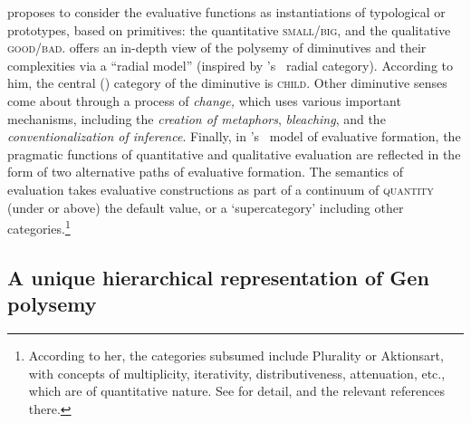 \citet{Wierzbicka1989} proposes to consider the evaluative functions as
instantiations of typological or  prototypes, based on 
primitives: the quantitative \textsc{small/big}, and the qualitative
\textsc{good/bad}. \citet{Jurafsky1996} offers an in-depth view of the polysemy
of diminutives and their  complexities via a ``radial model'' (inspired
by \citeauthor{Lakoff1987}'s~\citeyear{Lakoff1987} radial category). According
to him, the central () category of the diminutive is \textsc{child}.
Other diminutive senses come about through a process of \textit{
change,} which uses various important mechanisms, including the
\textit{creation of metaphors}, \textit{bleaching}, and the
\textit{conventionalization of inference}. Finally, in
\citeauthor{Kortvelyessy2014}'s~\citeyear{Kortvelyessy2014} model of evaluative
formation, the  pragmatic functions of quantitative and qualitative
evaluation are reflected in the form of two alternative paths of evaluative
formation. The semantics  of evaluation takes evaluative constructions as part
of a continuum of \textsc{quantity} (under or above) the default value, or a
`supercategory' including other categories.\footnote{According to her, the
categories subsumed include Plurality or Aktionsart, with concepts  of
multiplicity, iterativity, distributiveness, attenuation, etc., which are of
quantitative nature. See \citet{Kortvelyessy2014} for detail, and the relevant
references there.}

\subsection{A unique hierarchical representation of Gen polysemy}
\largerpage[2]

